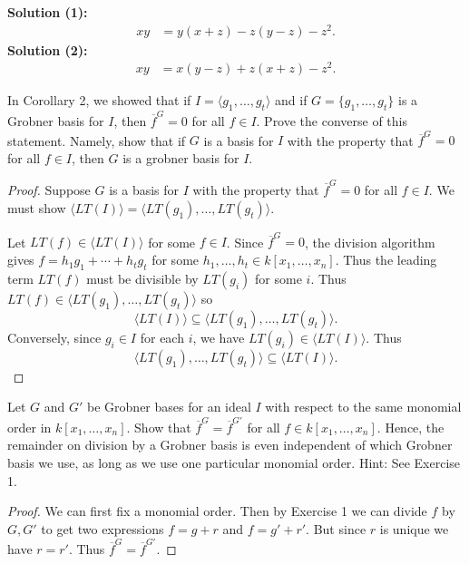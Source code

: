 \textbf{Solution (1):}
\begin{align*}
xy &= y(x+z) - z(y-z) - z^2.
\end{align*}
\textbf{Solution (2):}
\begin{align*}
xy &= x(y - z) + z(x + z) - z^2.
\end{align*}


\begin{tcolorbox}[title=Problem 3, breakable]
    In Corollary 2, we showed that if $I = \langle g_1, \ldots, g_t \rangle$ and if 
    $G = \{g_1, \ldots, g_t\}$ is a Grobner basis for $I$, then $\overline{f}^G = 0$
    for all $f \in I$. Prove the converse of this statement. Namely,
    show that if $G$ is a basis for $I$ with the property that $\overline{f}^G = 0$
    for all $f \in I$, then $G$ is a grobner basis for $I$. 
\end{tcolorbox}

\begin{proof}
    Suppose $G$ is a basis for $I$ with the property that $\overline{f}^G = 0$
    for all $f \in I$. We must show $\langle LT(I) \rangle = \langle LT(g_1), \ldots, LT(g_t) \rangle$.

    Let $LT(f) \in \langle LT(I) \rangle$ for some $f \in I$.
    Since $\overline{f}^G = 0$, the division algorithm gives
    $f = h_1 g_1 + \cdots + h_t g_t$ for some $h_1, \ldots, h_t \in k[x_1,\ldots,x_n]$.
    Thus the leading term $LT(f)$ must be divisible by $LT(g_i)$ for some $i$.
    Thus $LT(f) \in \langle LT(g_1), \ldots, LT(g_t) \rangle$ so
    \[
    \langle LT(I) \rangle \subseteq \langle LT(g_1), \ldots, LT(g_t) \rangle.
    \]
    Conversely, since $g_i \in I$ for each $i$, we have $LT(g_i) \in \langle LT(I) \rangle$.
    Thus
    \[
    \langle LT(g_1), \ldots, LT(g_t) \rangle \subseteq \langle LT(I) \rangle.
    \]
\end{proof}

\begin{tcolorbox}[title=Problem 4, breakable]
    Let $G$ and $G'$ be Grobner bases for an ideal $I$ with respect to the 
    same monomial order in $k[x_1, \ldots, x_n]$. Show that 
    $\overline{f}^G = \overline{f}^{G'}$ for all $f \in k[x_1, \ldots, x_n]$.
    Hence, the remainder on division by a Grobner basis is even independent of 
    which Grobner basis we use, as long as we use one particular monomial order.
    Hint: See Exercise 1.
\end{tcolorbox}

\begin{proof}
    We can first fix a monomial order.
    Then by Exercise 1 we can divide $f$ by $G, G'$ to get  
        two expressions $f = g + r$ and $f = g' + r'$.
    But since $r$ is unique we have $r = r'$.
    Thus $\overline{f}^G = \overline{f}^{G'}$.
\end{proof}


